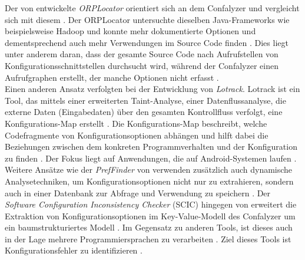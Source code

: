 \documentclass[german,bachelor]{swsLeipzig}
\begin{document}
Der von \citeauthor{7774519} entwickelte \textit{ORPLocator} orientiert sich an dem Confalyzer und vergleicht sich mit diesem \cite[S. 193]{7774519}.
Der ORPLocator untersuchte dieselben Java-Frameworks wie beispielsweise Hadoop und konnte mehr dokumentierte
Optionen und dementsprechend auch mehr Verwendungen im Source Code finden \cite[S. 193]{7774519}.
Dies liegt unter anderem daran, dass der gesamte Source Code nach Aufrufstellen von Konfigurationsschnittstellen durchsucht wird,
während der Confalyzer einen Aufrufgraphen erstellt, der manche Optionen nicht erfasst \cite[S. 193]{7774519}.\\

Einen anderen Ansatz verfolgten \citeauthor{8049300} bei der Entwicklung von \textit{Lotrack}.
Lotrack ist ein Tool, das mittels einer erweiterten Taint-Analyse, einer Datenflussanalyse, die externe Daten
(Eingabedaten) über den gesamten Kontrollfluss verfolgt, eine Konfigurations-Map erstellt \cite[S. 445]{8049300}.
Die Konfigurations-Map beschreibt, welche Codefragmente von Konfigurationsoptionen abhängen und hilft dabei die
Beziehungen zwischen dem konkreten Programmverhalten und der Konfiguration zu finden \cite[S. 447]{8049300}.
Der Fokus liegt auf Anwendungen, die auf Android-Systemen laufen \cite[S. 445]{8049300}. \\

Weitere Ansätze wie der \textit{PrefFinder} von \citeauthor{10.1145/2642937.2643009} verwenden zusätzlich auch dynamische
Analysetechniken, um Konfigurationsoptionen nicht nur zu extrahieren, sondern auch in einer Datenbank zur Abfrage und
Verwendung zu speichern \cite[S. 151]{10.1145/2642937.2643009}.
Der \textit{Software Configuration Inconsistency Checker} (SCIC) hingegen von \citeauthor{10.1145/2786805.2786869}
erweitert die Extraktion von Konfigurationsoptionen im Key-Value-Modell des Confalyzer um ein baumstrukturiertes Modell \cite[S. 295]{10.1145/2786805.2786869}.
Im Gegensatz zu anderen Tools, ist dieses auch in der Lage mehrere Programmiersprachen zu verarbeiten \cite[S. 295]{10.1145/2786805.2786869}.
Ziel dieses Tools ist Konfigurationsfehler zu identifizieren \cite[S. 295]{10.1145/2786805.2786869}.
\end{document}
